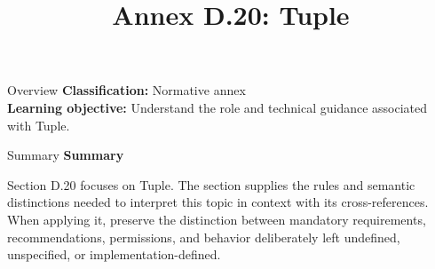 \documentclass[10pt,letterpaper]{article}
\title{Annex D.20: Tuple}
\author{}
\date{}
\begin{document}
\maketitle
\begin{CornellOverviewBox}{Overview}
\textbf{Classification:} Normative annex\\[2pt]
\textbf{Learning objective:} Understand the role and technical guidance associated with Tuple.
\end{CornellOverviewBox}\begin{CornellSummaryBox}{Summary}
{\sffamily\bfseries\color{Accent} Summary}\par\vspace{3pt}Section D.20 focuses on Tuple. The section supplies the rules and semantic distinctions needed to interpret this topic in context with its cross-references. When applying it, preserve the distinction between mandatory requirements, recommendations, permissions, and behavior deliberately left undefined, unspecified, or implementation-defined.
\end{CornellSummaryBox}
\end{document}
